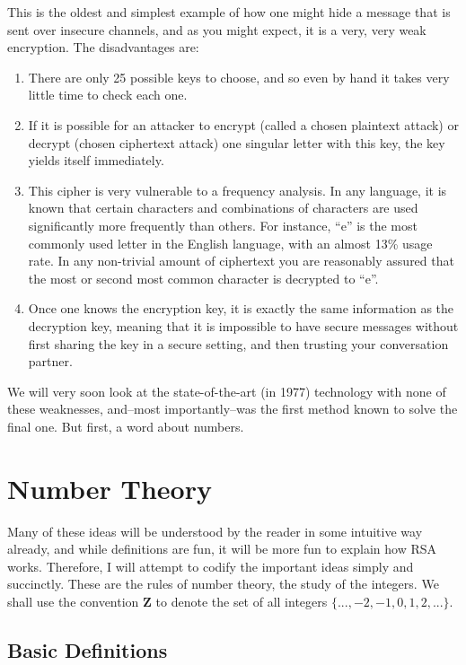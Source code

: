 \documentclass{article}
\begin{document}
        This is the oldest and simplest example of how one might hide a message that is sent over insecure channels, and as you might expect, it is a very, very weak encryption.
        The disadvantages are:
        \begin{enumerate}
            \item
            There are only 25 possible keys to choose, and so even by hand it takes very little time to check each one.
            \item
            If it is possible for an attacker to encrypt (called a chosen plaintext attack) or decrypt (chosen ciphertext attack) one singular letter with this key, the key yields itself immediately.
            \item
            This cipher is very vulnerable to a frequency analysis.  In any language, it is known that certain characters and combinations of characters are used significantly more frequently than others.  For instance, ``e'' is the most commonly used letter in the English language, with an almost 13\% usage rate.  In any non-trivial amount of ciphertext you are reasonably assured that the most or second most common character is decrypted to ``e''.
            \item
            Once one knows the encryption key, it is exactly the same information as the decryption key, meaning that it is impossible to have secure messages without first sharing the key in a secure setting, and then trusting your conversation partner.  
        \end{enumerate}
        
        We will very soon look at the state-of-the-art (in 1977) technology with none of these weaknesses, and--most importantly--was the first method known to solve the final one.  
        But first, a word about numbers.
        
    \section{Number Theory}
        Many of these ideas will be understood by the reader in some intuitive way already, and while definitions are fun, it will be more fun to explain how RSA works.
        Therefore, I will attempt to codify the important ideas simply and succinctly.  
        These are the rules of number theory, the study of the integers.  We shall use the convention $\mathbf{Z}$ to denote the set of all integers $\{...,-2,-1,0,1,2,...\}$.
        
        \subsection{Basic Definitions}
\end{document}
